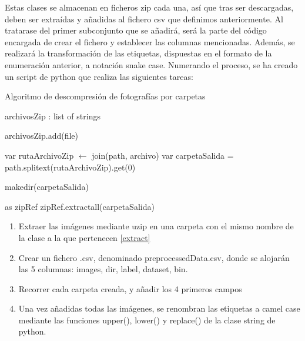 Estas clases se almacenan en ficheros zip cada una, así que tras ser descargadas, deben ser extraídas y añadidas al fichero csv que definimos anteriormente. Al tratarase del primer subconjunto que se añadirá, será la parte del código encargada de crear el fichero y establecer las columnas mencionadas. Además, se realizará la transformación de las etiquetas, dispuestas en el formato de la enumeración anterior, a notación snake case. Numerando el proceso, se ha creado un script de python que realiza las siguientes tareas:

 
 \begin{algorithm}[H]
 	\label{extract}
 	\caption{Algoritmo de descompresión de fotografías por carpetas}
 	\begin{algorithmic}[1]
 		
 		 		\State archivosZip : list of strings
 		 		
 			\State archivosZip.add(file)
 		\EndFor

			\State var rutaArchivoZip  $\gets$ join(path, archivo)
			\State var carpetaSalida = path.splitext(rutaArchivoZip).get(0) 
		
				\State makedir(carpetaSalida) 

			\State {} as zipRef
			\State zipRef.extractall(carpetaSalida)
			 \EndIf
		\EndFor
 		\EndProcedure
 		
 	\end{algorithmic}
 \end{algorithm}
 
 


\begin{enumerate}
	\item Extraer las imágenes mediante uzip en una carpeta con el mismo nombre de la clase a la que pertenecen \ref{extract}
	\item Crear un fichero .csv, denominado preprocessedData.csv, donde se alojarán las 5 columnas: images, dir, label, dataset, bin.
	\item Recorrer cada carpeta creada, y añadir los 4 primeros campos
	\item Una vez añadidas todas las imágenes, se renombran las etiquetas a camel case mediante las funciones upper(), lower() y replace() de la clase string de python.
\end{enumerate}

